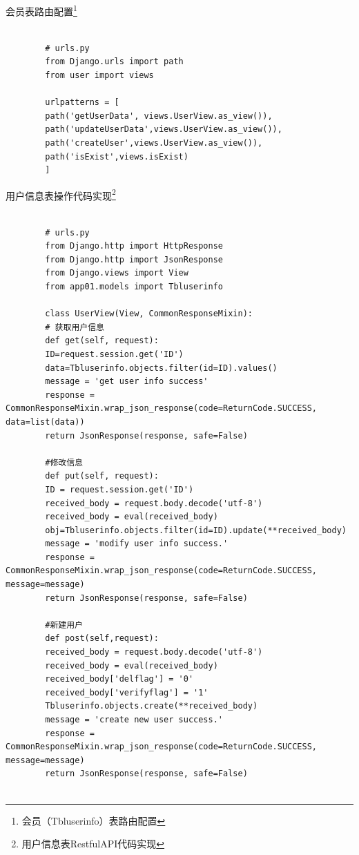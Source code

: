 \documentclass[a4paper]{ltxdoc}
\begin{document}
{		%
		
		会员表路由配置\footnote{会员（Tbluserinfo）表路由配置}
		\begin{verbatim}
		
		# urls.py
		from Django.urls import path
		from user import views
		
		urlpatterns = [
		path('getUserData', views.UserView.as_view()),
		path('updateUserData',views.UserView.as_view()),
		path('createUser',views.UserView.as_view()),
		path('isExist',views.isExist)
		]
		\end{verbatim}
		
		用户信息表操作代码实现\footnote{用户信息表RestfulAPI代码实现}
		\begin{verbatim}
		
		# urls.py
		from Django.http import HttpResponse
		from Django.http import JsonResponse
		from Django.views import View
		from app01.models import Tbluserinfo
		
		class UserView(View, CommonResponseMixin):
		# 获取用户信息
		def get(self, request):
		ID=request.session.get('ID')
		data=Tbluserinfo.objects.filter(id=ID).values()
		message = 'get user info success'
		response = CommonResponseMixin.wrap_json_response(code=ReturnCode.SUCCESS, data=list(data))
		return JsonResponse(response, safe=False)
		
		#修改信息
		def put(self, request):
		ID = request.session.get('ID')
		received_body = request.body.decode('utf-8')
		received_body = eval(received_body)
		obj=Tbluserinfo.objects.filter(id=ID).update(**received_body)
		message = 'modify user info success.'
		response = CommonResponseMixin.wrap_json_response(code=ReturnCode.SUCCESS, message=message)
		return JsonResponse(response, safe=False)
		
		#新建用户
		def post(self,request):
		received_body = request.body.decode('utf-8')
		received_body = eval(received_body)
		received_body['delflag'] = '0'
		received_body['verifyflag'] = '1'
		Tbluserinfo.objects.create(**received_body)
		message = 'create new user success.'
		response = CommonResponseMixin.wrap_json_response(code=ReturnCode.SUCCESS, message=message)
		return JsonResponse(response, safe=False)
		

\end{verbatim}}
\end{document}
